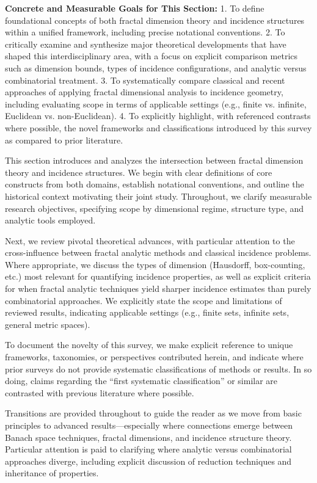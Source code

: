 \documentclass[sigconf]{acmart}
\begin{document}
\textbf{Concrete and Measurable Goals for This Section:}
1. To define foundational concepts of both fractal dimension theory and incidence structures within a unified framework, including precise notational conventions.
2. To critically examine and synthesize major theoretical developments that have shaped this interdisciplinary area, with a focus on explicit comparison metrics such as dimension bounds, types of incidence configurations, and analytic versus combinatorial treatment.
3. To systematically compare classical and recent approaches of applying fractal dimensional analysis to incidence geometry, including evaluating scope in terms of applicable settings (e.g., finite vs. infinite, Euclidean vs. non-Euclidean).
4. To explicitly highlight, with referenced contrasts where possible, the novel frameworks and classifications introduced by this survey as compared to prior literature.

This section introduces and analyzes the intersection between fractal dimension theory and incidence structures. We begin with clear definitions of core constructs from both domains, establish notational conventions, and outline the historical context motivating their joint study. Throughout, we clarify measurable research objectives, specifying scope by dimensional regime, structure type, and analytic tools employed.

Next, we review pivotal theoretical advances, with particular attention to the cross-influence between fractal analytic methods and classical incidence problems. Where appropriate, we discuss the types of dimension (Hausdorff, box-counting, etc.) most relevant for quantifying incidence properties, as well as explicit criteria for when fractal analytic techniques yield sharper incidence estimates than purely combinatorial approaches. We explicitly state the scope and limitations of reviewed results, indicating applicable settings (e.g., finite sets, infinite sets, general metric spaces).

To document the novelty of this survey, we make explicit reference to unique frameworks, taxonomies, or perspectives contributed herein, and indicate where prior surveys do not provide systematic classifications of methods or results. In so doing, claims regarding the ``first systematic classification'' or similar are contrasted with previous literature where possible.

Transitions are provided throughout to guide the reader as we move from basic principles to advanced results—especially where connections emerge between Banach space techniques, fractal dimensions, and incidence structure theory. Particular attention is paid to clarifying where analytic versus combinatorial approaches diverge, including explicit discussion of reduction techniques and inheritance of properties.
\end{document}
